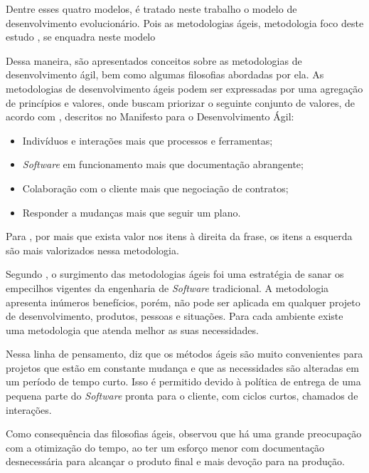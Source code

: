 Dentre esses quatro modelos, é tratado neste trabalho o modelo de desenvolvimento 
evolucionário. Pois as metodologias ágeis, metodologia foco deste estudo
, se enquadra neste modelo


Dessa maneira, são apresentados conceitos sobre as metodologias de desenvolvimento ágil, bem como algumas filosofias abordadas por ela.
As metodologias de desenvolvimento ágeis podem ser expressadas por uma agregação de princípios e valores, onde buscam priorizar o seguinte conjunto de valores, de acordo com \cite{beck2001agile}, descritos no Manifesto para o Desenvolvimento Ágil:


\begin{itemize}
    \item Indivíduos e interações mais que processos e ferramentas;
    \item \textit{Software} em funcionamento mais que documentação abrangente;
    \item Colaboração com o cliente mais que negociação de contratos;
    \item Responder a mudanças mais que seguir um plano.
\end{itemize}

Para \cite{beck2001agile}, por mais que exista valor nos itens à direita da frase, os itens a esquerda são mais valorizados nessa metodologia.

Segundo \cite{pressman2009engenharia}, o surgimento das metodologias ágeis foi uma estratégia de sanar os empecilhos vigentes da engenharia de \textit{Software} tradicional. A metodologia apresenta inúmeros benefícios, porém, não pode ser aplicada em qualquer projeto de desenvolvimento, produtos, pessoas e situações. Para cada ambiente existe uma metodologia que atenda melhor as suas necessidades.

Nessa linha de pensamento, \cite{pressman2009engenharia} diz que os métodos ágeis são muito convenientes para projetos que estão em constante mudança e que as necessidades são alteradas em um período de tempo curto. Isso é permitido devido à política de entrega de uma pequena parte do \textit{Software} pronta para o cliente, com ciclos curtos, chamados de interações.

Como consequência das filosofias ágeis, \cite{soares} observou que há uma grande preocupação com a otimização do tempo, ao ter um esforço menor com documentação desnecessária para alcançar o produto final e mais devoção para na produção.


